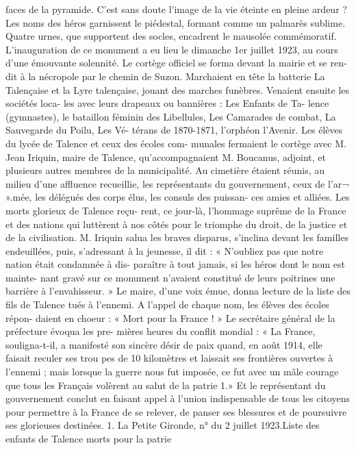 \documentclass[a4paper,11pt]{book}
\begin{document}
faces de la pyramide. C'est sans doute l'image de la vie
éteinte en pleine ardeur ?
Les noms des héros garnissent le piédestal, formant
comme un palmarès sublime. Quatre urnes, que supportent
des socles, encadrent le mausolée commémoratif.
L'inauguration de ce monument a eu lieu le dimanche
1er juillet 1923, au cours d'une émouvante solennité.
Le cortège officiel se forma devant la mairie et se ren-
dit à la nécropole par le chemin de Suzon. Marchaient en
tête la batterie La Talençaise et la Lyre talençaise, jouant
des marches funèbres. Venaient ensuite les sociétés loca-
les avec leurs drapeaux ou bannières : Les Enfants de Ta-
lence (gymnastes), le bataillon féminin des Libellules, Les
Camarades de combat, La Sauvegarde du Poilu, Les Vé-
térans de 1870-1871, l'orphéon l'Avenir.
Les élèves du lycée de Talence et ceux des écoles com-
munales fermaient le cortège avec M. Jean Iriquin, maire
de Talence, qu'accompagnaient M. Boucanus, adjoint, et
plusieurs autres membres de la municipalité.
Au cimetière étaient réunis, au milieu d'une affluence
recueillie, les représentants du gouvernement, ceux de l'ar¬
».mée, les délégués des corps élus, les consuls des puissan-
ces amies et alliées. Les morts glorieux de Talence reçu-
rent, ce jour-là, l'hommage suprême de la France et des
nations qui luttèrent à nos côtés pour le triomphe du droit,
de la justice et de la civilisation.
M. Iriquin salua les braves disparus, s'inclina devant
les familles endeuillées, puis, s'adressant à la jeunesse, il
dit :
« N'oubliez pas que notre nation était condamnée à dis-
paraître à tout jamais, si les héros dont le nom est mainte-
nant gravé sur ce monument n'avaient constitué de leurs
poitrines une barrière à l'envahisseur. »
Le maire, d'une voix émue, donna lecture de la liste des
fils de Talence tués à l'ennemi.
A l'appel de chaque nom, les élèves des écoles répon-
daient en choeur : « Mort pour la France ! »
Le secrétaire général de la préfecture évoqua les pre-
mières heures du conflit mondial :
« La France, souligna-t-il, a manifesté son sincère désir
de paix quand, en août 1914, elle faisait reculer ses trou
pes de 10 kilomètres et laissait ses frontières ouvertes à
l'ennemi ; mais lorsque la guerre nous fut imposée, ce fut
avec un mâle courage que tous les Français volèrent au
salut de la patrie 1.»
Et le représentant du gouvernement conclut en faisant
appel à l'union indispensable de tous les citoyens pour
permettre à la France de se relever, de panser ses blessures
et de poursuivre ses glorieuses destinées.
1. La Petite Gironde, n° du 2 juillet 1923.Liste des enfants de Talence morts pour la patrie
\end{document}
